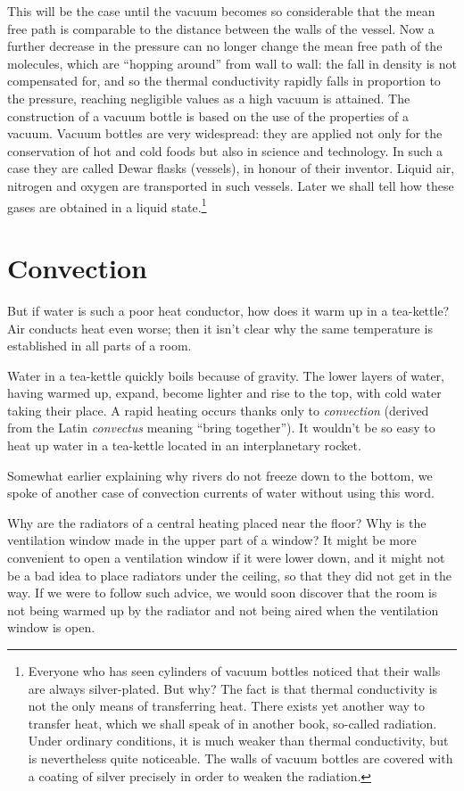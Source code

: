This will be the case until the vacuum becomes so con­siderable that the mean free path is comparable to the distance between the walls of the vessel. Now a further decrease in the pressure can no longer change the mean free path of the molecules, which are ``hopping around'' from wall to wall: the fall in density is not compensated for, and so the thermal conductivity rapidly falls in proportion to the pressure, reaching negligible values as a high vacuum is attained. The construction of a vacuum bottle is based on the use of the properties of a vacuum. Vacuum bottles are very widespread: they are applied not only for the conservation of hot and cold foods but also in science and technology. In such a case they are called Dewar flasks (vessels), in honour of their inventor. Liq­uid air, nitrogen and oxygen are transported in such vessels. Later we shall tell how these gases are obtained in a liquid state.\footnote{Everyone who has seen cylinders of vacuum bottles noticed that their walls are always silver-plated. But why? The fact is that thermal conductivity is not the only means of trans­ferring heat. There exists yet another way to transfer heat, which we shall speak of in another book, so-called radiation. Under ordinary conditions, it is much weaker than thermal conductivity, but is nevertheless quite noticeable. The walls of vacuum bottles are covered with a coating of silver precisely in order to weaken the radiation.}

\section{Convection}

But if water is such a poor heat conductor, how does it warm up in a tea-kettle? Air conducts heat even worse; then it isn’t clear why the same temperature is established in all parts of a room.

Water in a tea-kettle quickly boils because of gravity. The lower layers of water, having warmed up, expand, become lighter and rise to the top, with cold water tak­ing their place. A rapid heating occurs thanks only to \emph{convection} (derived from the Latin \emph{convectus} meaning ``bring together''). It wouldn’t be so easy to heat up water in a tea-kettle located in an interplanetary rocket.

Somewhat earlier explaining why rivers do not freeze down to the bottom, we spoke of another case of convec­tion currents of water without using this word.

Why are the radiators of a central heating placed near the floor? Why is the ventilation window made in the upper part of a window? It might be more convenient to open a ventilation window if it were lower down, and it might not be a bad idea to place radiators under the ceiling, so that they did not get in the way. If we were to follow such advice, we would soon discover that the room is not being warmed up by the radia­tor and not being aired when the ventilation window is open.

